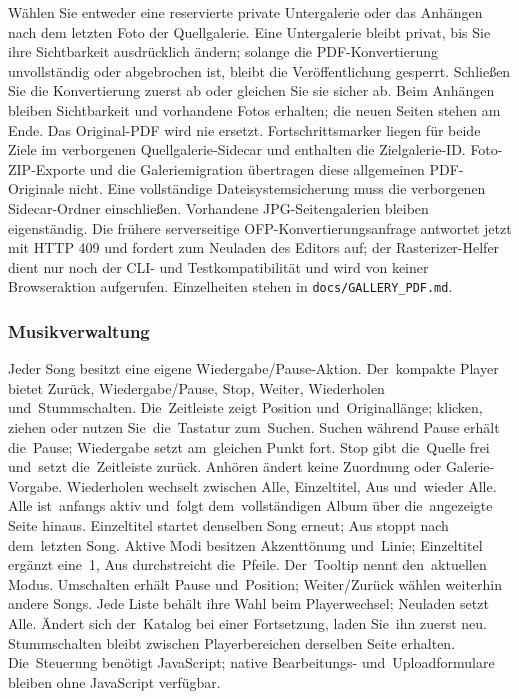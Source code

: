 \documentclass[11pt,a4paper]{article}
\newcommand{\codeword}[1]{\nolinkurl{#1}}
\begin{document}
Wählen Sie entweder eine reservierte private Untergalerie oder das Anhängen nach
dem letzten Foto der Quellgalerie. Eine Untergalerie bleibt privat, bis Sie ihre
Sichtbarkeit ausdrücklich ändern; solange die PDF-Konvertierung unvollständig
oder abgebrochen ist, bleibt die Veröffentlichung gesperrt. Schließen Sie die
Konvertierung zuerst ab oder gleichen Sie sie sicher ab. Beim Anhängen bleiben
Sichtbarkeit und vorhandene Fotos erhalten; die neuen Seiten stehen am Ende. Das
Original-PDF wird nie ersetzt. Fortschrittsmarker liegen für beide Ziele im
verborgenen Quellgalerie-Sidecar und enthalten die Zielgalerie-ID.
Foto-ZIP-Exporte und die Galeriemigration übertragen diese allgemeinen
PDF-Originale nicht. Eine vollständige Dateisystemsicherung muss die verborgenen
Sidecar-Ordner einschließen. Vorhandene JPG-Seitengalerien bleiben eigenständig.
Die frühere serverseitige OFP-Konvertierungsanfrage antwortet jetzt mit HTTP 409
und fordert zum Neuladen des Editors auf; der Rasterizer-Helfer dient nur noch
der CLI- und Testkompatibilität und wird von keiner Browseraktion aufgerufen.
Einzelheiten stehen in \codeword{docs/GALLERY\_PDF.md}.

\subsubsection{Musikverwaltung}

Jeder Song besitzt eine eigene Wiedergabe/Pause-Aktion. Der~kompakte Player
bietet Zurück, Wiedergabe/Pause, Stop, Weiter, Wiederholen und~Stummschalten.
Die~Zeitleiste zeigt Position und~Originallänge; klicken, ziehen oder nutzen
Sie~die~Tastatur zum~Suchen. Suchen während Pause erhält die~Pause; Wiedergabe
setzt am~gleichen Punkt fort. Stop gibt die~Quelle frei und~setzt die~Zeitleiste
zurück. Anhören ändert keine Zuordnung oder Galerie-Vorgabe. Wiederholen
wechselt zwischen Alle, Einzeltitel, Aus und~wieder Alle. Alle ist~anfangs aktiv
und~folgt dem~vollständigen Album über die~angezeigte Seite hinaus.
Einzeltitel startet denselben Song erneut; Aus stoppt nach dem~letzten Song.
Aktive Modi besitzen Akzenttönung und~Linie; Einzeltitel ergänzt eine~1,
Aus durchstreicht die~Pfeile. Der~Tooltip nennt den~aktuellen Modus.
Umschalten erhält Pause und~Position; Weiter/Zurück wählen weiterhin andere
Songs. Jede Liste behält ihre Wahl beim Playerwechsel; Neuladen setzt Alle.
Ändert sich der~Katalog bei einer Fortsetzung, laden Sie~ihn zuerst neu.
Stummschalten bleibt zwischen Playerbereichen derselben Seite erhalten.
Die~Steuerung benötigt JavaScript; native Bearbeitungs- und~Uploadformulare
bleiben ohne JavaScript verfügbar.
\end{document}
